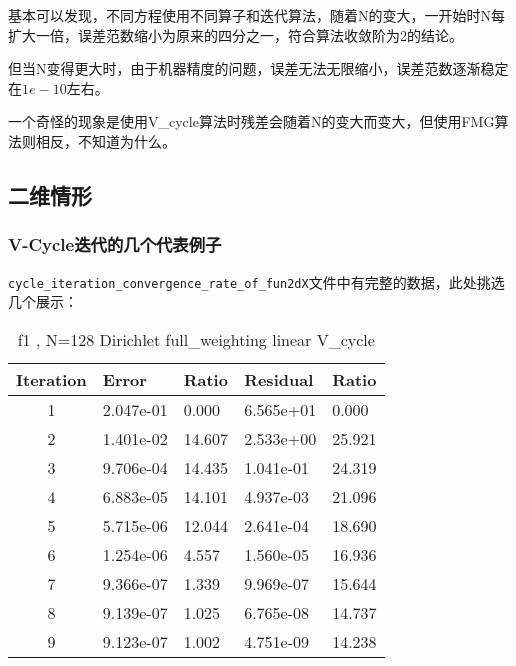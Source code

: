\documentclass[12]{article}%
\begin{document}
基本可以发现，不同方程使用不同算子和迭代算法，随着N的变大，一开始时N每扩大一倍，误差范数缩小为原来的四分之一，符合算法收敛阶为2的结论。

但当N变得更大时，由于机器精度的问题，误差无法无限缩小，误差范数逐渐稳定在$1e-10$左右。

一个奇怪的现象是使用V\_cycle算法时残差会随着N的变大而变大，但使用FMG算法则相反，不知道为什么。

\subsection{二维情形}
\subsubsection{{V-Cycle迭代的几个代表例子}}
\verb|cycle_iteration_convergence_rate_of_fun2dX|文件中有完整的数据，此处挑选几个展示：

\begin{table}[H]
    \centering
    \caption{f1 , N=128  Dirichlet full\_weighting linear V\_cycle}
    \begin{tabular}{|c|l|l|l|l|}
    \hline
    Iteration & Error       & Ratio     & Residual    & Ratio     \\ \hline
    
    1 & 2.047e-01 & 0.000 & 6.565e+01 & 0.000\\ \hline 
    2 & 1.401e-02 & 14.607 & 2.533e+00 & 25.921\\ \hline 
    3 & 9.706e-04 & 14.435 & 1.041e-01 & 24.319\\ \hline 
    4 & 6.883e-05 & 14.101 & 4.937e-03 & 21.096\\ \hline 
    5 & 5.715e-06 & 12.044 & 2.641e-04 & 18.690\\ \hline 
    6 & 1.254e-06 & 4.557 & 1.560e-05 & 16.936\\ \hline 
    7 & 9.366e-07 & 1.339 & 9.969e-07 & 15.644\\ \hline 
    8 & 9.139e-07 & 1.025 & 6.765e-08 & 14.737\\ \hline 
    9 & 9.123e-07 & 1.002 & 4.751e-09 & 14.238\\ \hline     \end{tabular}
    \end{table}
\end{document}
